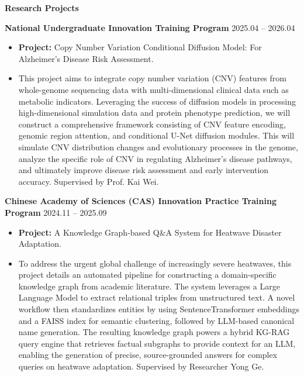 \documentclass[11pt]{article}
\begin{document}
	\begin{center}
		\textbf{\large Research Projects}
	\end{center}
	\textbf{National Undergraduate Innovation Training Program} \hfill 2025.04 – 2026.04
	\begin{itemize}[noitemsep, topsep=0pt, partopsep=0pt, parsep=0pt, leftmargin=*]
		\item \textbf{Project:} Copy Number Variation Conditional Diffusion Model: For Alzheimer's Disease Risk Assessment.
		\item This project aims to integrate copy number variation (CNV) features from whole-genome sequencing data with multi-dimensional clinical data such as metabolic indicators. Leveraging the success of diffusion models in processing high-dimensional simulation data and protein phenotype prediction, we will construct a comprehensive framework consisting of CNV feature encoding, genomic region attention, and conditional U-Net diffusion modules. This will simulate CNV distribution changes and evolutionary processes in the genome, analyze the specific role of CNV in regulating Alzheimer's disease pathways, and ultimately improve disease risk assessment and early intervention accuracy. Supervised by Prof. Kai Wei.
	\end{itemize}
	
	\vspace{10pt}
	
	\textbf{Chinese Academy of Sciences (CAS) Innovation Practice Training Program} \hfill 2024.11 – 2025.09
	\begin{itemize}[noitemsep, topsep=0pt, partopsep=0pt, parsep=0pt, leftmargin=*]
		\item \textbf{Project:} A Knowledge Graph-based Q\&A System for Heatwave Disaster Adaptation.
		\item To address the urgent global challenge of increasingly severe heatwaves, this project details an automated pipeline for constructing a domain-specific knowledge graph from academic literature. The system leverages a Large Language Model to extract relational triples from unstructured text. A novel workflow then standardizes entities by using SentenceTransformer embeddings and a FAISS index for semantic clustering, followed by LLM-based canonical name generation. The resulting knowledge graph powers a hybrid KG-RAG query engine that retrieves factual subgraphs to provide context for an LLM, enabling the generation of precise, source-grounded answers for complex queries on heatwave adaptation. Supervised by Researcher Yong Ge.
	\end{itemize}
	
\end{document}
